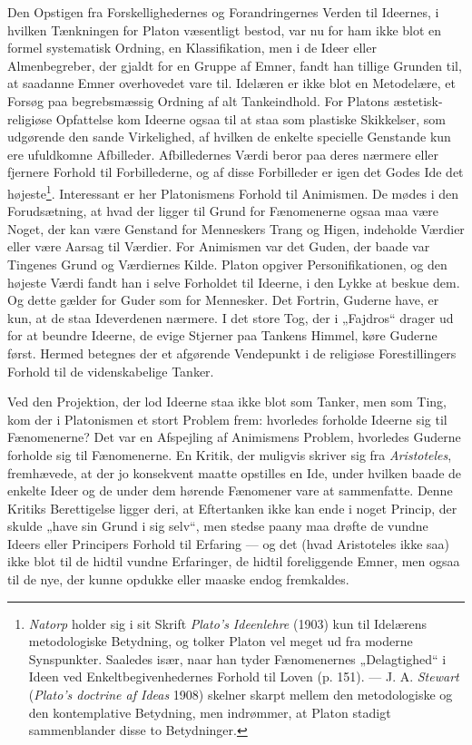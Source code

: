 \documentclass[12pt,a4paper]{book}
\newcommand{\apage}[1]{\marginnote{\footnotesize\textit{[#1]}}}
\begin{document}
Den Opstigen fra Forskellighedernes og Forandringernes Verden til
Ideernes, i hvilken Tænkningen for Platon væsentligt bestod, var nu for
ham ikke blot en formel systematisk Ordning, en Klassifikation, men i de
Ideer eller Almenbegreber, der gjaldt for en Gruppe af Emner, fandt han
tillige Grunden til, at saadanne Emner overhovedet vare til. Idelæren er
ikke blot en Metodelære, et Forsøg paa begrebsmæssig Ordning af alt
Tankeindhold. For Platons æstetisk-religiøse Opfattelse kom Ideerne
ogsaa til at staa som plastiske Skikkelser, som udgørende den sande
Virkelighed, af hvilken de enkelte specielle Genstande kun ere
ufuldkomne Afbilleder. Afbilledernes Værdi beror paa deres nærmere eller
fjernere Forhold til Forbillederne, og af disse Forbilleder er igen det
Godes Ide det højeste\footnote{\emph{Natorp} holder sig i sit Skrift
\emph{Plato's Ideenlehre} (1903) kun til Idelærens metodologiske
Betydning, og tolker Platon vel meget ud fra moderne Synspunkter.
Saaledes især, naar han tyder Fænomenernes „Delagtighed“ i Ideen ved
Enkeltbegivenhedernes Forhold til Loven (p. 151). --- J. A.
\emph{Stewart} (\emph{Plato's doctrine af Ideas} 1908) skelner skarpt
mellem den metodologiske og den kontemplative Betydning, men indrømmer,
at Platon stadigt sammenblander disse to Betydninger.}. Interessant er
her Platonismens Forhold til Animismen. De mødes i den Forudsætning, at
hvad der ligger til Grund for Fænomenerne ogsaa maa være Noget, der kan
være Genstand for Menneskers Trang og Higen, indeholde Værdier eller
være Aarsag til Værdier. For Animismen var det Guden, der baade var
Tingenes Grund og Værdiernes Kilde. Platon opgiver Personifikationen, og
den højeste Værdi fandt han i selve Forholdet til Ideerne, i den Lykke
at beskue dem. Og dette gælder for Guder som for Mennesker. Det Fortrin,
Guderne have, er kun, at de staa Ideverdenen nærmere. I det store Tog,
der i „Fajdros“ drager ud for at beundre Ideerne, de evige Stjerner paa \apage{120}
Tankens Himmel, køre Guderne først. Hermed betegnes der et afgørende
Vendepunkt i de religiøse Forestillingers Forhold til de videnskabelige
Tanker.

Ved den Projektion, der lod Ideerne staa ikke blot som Tanker, men som
Ting, kom der i Platonismen et stort Problem frem: hvorledes forholde
Ideerne sig til Fænomenerne? Det var en Afspejling af Animismens
Problem, hvorledes Guderne forholde sig til Fænomenerne. En Kritik, der
muligvis skriver sig fra \emph{Aristoteles}, fremhævede, at der jo
konsekvent maatte opstilles en Ide, under hvilken baade de enkelte Ideer
og de under dem hørende Fænomener vare at sammenfatte. Denne Kritiks
Berettigelse ligger deri, at Eftertanken ikke kan ende i noget Princip,
der skulde „have sin Grund i sig selv“, men stedse paany maa drøfte de
vundne Ideers eller Principers Forhold til Erfaring --- og det (hvad
Aristoteles ikke saa) ikke blot til de hidtil vundne Erfaringer, de
hidtil foreliggende Emner, men ogsaa til de nye, der kunne opdukke eller
maaske endog fremkaldes.
\end{document}
